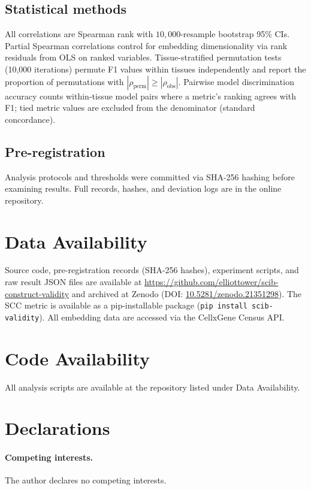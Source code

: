 \documentclass[11pt]{article}
\begin{document}
\subsection{Statistical methods}

All correlations are Spearman rank with $10{,}000$-resample bootstrap
95\% CIs. Partial Spearman correlations control for embedding
dimensionality via rank residuals from OLS on ranked variables.
Tissue-stratified permutation tests (10,000 iterations) permute F1
values within tissues independently and report the proportion of
permutations with $|\rho_{\mathrm{perm}}| \geq |\rho_{\mathrm{obs}}|$.
Pairwise model discrimination accuracy counts within-tissue model pairs
where a metric's ranking agrees with F1; tied metric values are excluded
from the denominator (standard concordance).

\subsection{Pre-registration}

Analysis protocols and thresholds were committed via SHA-256 hashing
before examining results. Full records, hashes, and deviation logs are
in the online repository.


\section*{Data Availability}

Source code, pre-registration records (SHA-256 hashes), experiment
scripts, and raw result JSON files are available at
\url{https://github.com/elliottower/scib-construct-validity} and
archived at Zenodo (DOI:
\href{https://doi.org/10.5281/zenodo.21351298}{10.5281/zenodo.21351298}).
The SCC metric is available as a pip-installable package (\texttt{pip
install scib-validity}). All embedding data are accessed via the
CellxGene Census API.

\section*{Code Availability}

All analysis scripts are available at the repository listed under Data
Availability.

\section*{Declarations}

\paragraph{Competing interests.} The author declares no competing
interests.
\end{document}
